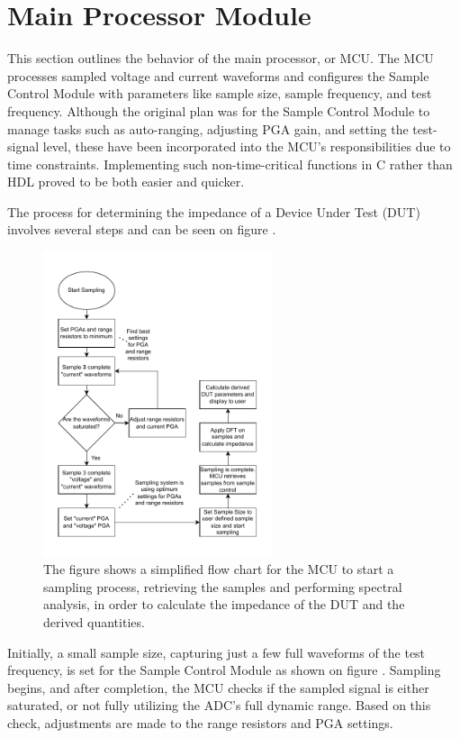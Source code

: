 \chapter{Main Processor Module} \label{sec:MCU}

This section outlines the behavior of the main processor, or MCU. The MCU processes sampled voltage and current waveforms and configures the Sample Control Module with parameters like sample size, sample frequency, and test frequency. Although the original plan was for the Sample Control Module to manage tasks such as auto-ranging, adjusting PGA gain, and setting the test-signal level, these have been incorporated into the MCU's responsibilities due to time constraints. Implementing such non-time-critical functions in C rather than HDL proved to be both easier and quicker.

The process for determining the impedance of a Device Under Test (DUT) involves several steps and can be seen on figure .

\begin{figure}[H]
    \centering
    \includegraphics[clip, trim=0 15 15 0, width=0.60\textwidth]{Sections/7_SystemDesign/Figures/MainProcessorFunction.pdf}
    \caption{The figure shows a simplified flow chart for the MCU to start a sampling process, retrieving the samples and performing spectral analysis, in order to calculate the impedance of the DUT and the derived quantities.}
    \label{fig:7_x_MCULOOP}
\end{figure}

Initially, a small sample size, capturing just a few full waveforms of the test frequency, is set for the Sample Control Module as shown on figure . Sampling begins, and after completion, the MCU checks if the sampled signal is either saturated, or not fully utilizing the ADC's full dynamic range. Based on this check, adjustments are made to the range resistors and PGA settings. 


